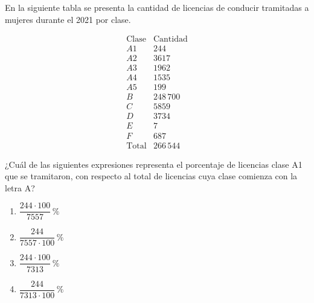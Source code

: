 \begin{problem}
    En la siguiente tabla se presenta la cantidad de licencias de conducir tramitadas a mujeres durante el 2021 por clase.

    \[
    \begin{array}{c|c}
    \text{Clase} & \text{Cantidad} \\
    \hline
    A1 & 244 \\
    A2 & 3617 \\
    A3 & 1962 \\
    A4 & 1535 \\
    A5 & 199 \\
    B & 248\,700 \\
    C & 5859 \\
    D & 3734 \\
    E & 7 \\
    F & 687 \\
    \hline
    \text{Total} & 266\,544
    \end{array}
    \]

    ¿Cuál de las siguientes expresiones representa el porcentaje de licencias clase A1 que se tramitaron, con respecto al total de licencias cuya clase comienza con la letra A?

    \begin{enumerate}[label=\Alph*.]
        \item $\dfrac{244 \cdot 100}{7557}\,\%$
        \item $\dfrac{244}{7557 \cdot 100}\,\%$
        \item $\dfrac{244 \cdot 100}{7313}\,\%$
        \item $\dfrac{244}{7313 \cdot 100}\,\%$
    \end{enumerate}
\end{problem}

